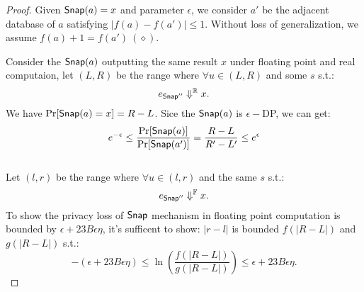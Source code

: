 \documentclass[a4paper,11pt]{article}
\begin{document}
\begin{proof}
%
%
Given $\mathsf{Snap}(a) = x$ and parameter $\epsilon$, we consider $a'$ be the adjacent database of $a$ satisfying $|f(a) - f(a')| \leq 1$.
Without loss of generalization, we assume $f(a) + 1 = f(a') ~ (\diamond)$.
%

%
Consider the $\mathsf{Snap}(a)$ outputting the same result $x$ under floating point and real computaion, let $(L, R)$ be the range where $\forall u \in (L, R)$ and some $s$ s.t.:
%
$$e_{\mathsf{Snap}''} \Downarrow^{\mathbb{R}} x.$$
%
We have $\Pr[\mathsf{Snap}(a) = x] = R - L$. Sice the $\mathsf{Snap}(a)$ is $\epsilon-$DP, we can get:
\[
	e^{-\epsilon} \leq \frac{\Pr[\mathsf{Snap}(a)]}{\Pr[\mathsf{Snap}(a')]} = \frac{R - L}{R' - L'} \leq e^{\epsilon}
\]
%
\\
%
Let $(l, r)$ be the range where $\forall u \in (l, r)$ and the same $s$ s.t.: 
%
$$e_{\mathsf{Snap}''} \Downarrow^{\mathbb{F}} x.$$
%
To show the privacy loss of $\mathsf{Snap}$ mechanism in floating point computation is bounded by $\epsilon + 23 B \epsilon \eta$, it’s sufficent to show:
$|r - l|$ is bounded $f(|{R} - {L}|)$ and $g(|{R} - {L}|)$ s.t.:
%
\[
	-(\epsilon + 23 B \epsilon \eta)
	\leq \ln( \frac{f(|{R} - {L}|)}{g(|{R} - {L}|)} )
	\leq \epsilon + 23 B \epsilon \eta.
\]


\end{proof}
\end{document}
